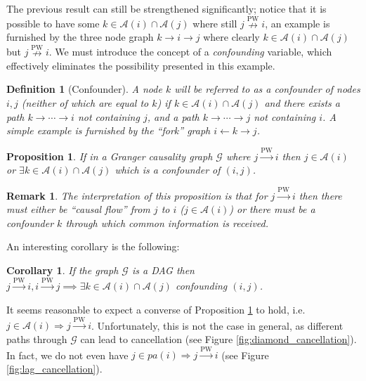 \documentclass{statsoc}
\def\pwgc{\overset{\text{PW}}{\rightarrow}}  %
\def\npwgc{\overset{\text{PW}}{\nrightarrow}}  %
\def\gcg{\mathcal{G}}  %
\newcommand{\pa}[1]{pa(#1)}  %
\newcommand{\anc}[1]{\mathcal{A}(#1)}  %
\newcommand{\gcgpath}[2]{#1 \rightarrow \cdots \rightarrow #2}  %
\newtheorem{corollary}{Corollary}
\newtheorem{proposition}{Proposition}
\newtheorem{remark}{Remark}
\newtheorem{definition}{Definition}
\begin{document}
The previous result can still be strengthened significantly; notice
that it is possible to have some $k \in \anc{i} \cap \anc{j}$ where still
$j \npwgc i$, an example is furnished by the three node graph
$k \rightarrow i \rightarrow j$ where clearly
$k \in \anc{i}\cap\anc{j}$ but $j \npwgc i$.  We must introduce the concept
of a \textit{confounding} variable, which effectively eliminates the
possibility presented in this example.

\begin{definition}[Confounder]
  A node $k$ will be referred to as a \textit{confounder} of nodes
  $i, j$ (neither of which are equal to $k$) if
  $k \in \anc{i} \cap \anc{j}$ and there exists a path
  $\gcgpath{k}{i}$ not containing $j$, and a path $\gcgpath{k}{j}$ not
  containing $i$. A simple example is furnished by the ``fork'' graph
  $i \leftarrow k \rightarrow j$.
\end{definition}

\begin{proposition}
  \label{prop:ancestor_properties}
  If in a Granger causality graph $\gcg$ where $j \pwgc i$ then
  $j \in \anc{i}$ or $\exists k \in \anc{i} \cap\anc{j}$ which is a
  confounder of $(i, j)$.
\end{proposition}

\begin{remark}
  The interpretation of this proposition is that for $j \pwgc i$ then
  there must either be ``causal flow'' from $j$ to $i$
  ($j \in \anc{i}$) or there must be a confounder $k$ through which
  common information is received.
\end{remark}

An interesting corollary is the following:

\begin{corollary}
  If the graph $\gcg$ is a DAG then $j \pwgc i, i \pwgc j \implies \exists k \in \anc{i} \cap \anc{j}$ confounding $(i, j)$.
\end{corollary}

It seems reasonable to expect a converse of Proposition
\ref{prop:ancestor_properties} to hold, i.e.
$j \in \anc{i} \Rightarrow j \pwgc i$.  Unfortunately, this is not the
case in general, as different paths through $\gcg$ can lead to
cancellation (see Figure \ref{fig:diamond_cancellation}).  In fact, we
do not even have $j \in \pa{i} \Rightarrow j \pwgc i$ (see Figure
\ref{fig:lag_cancellation}).
\end{document}
